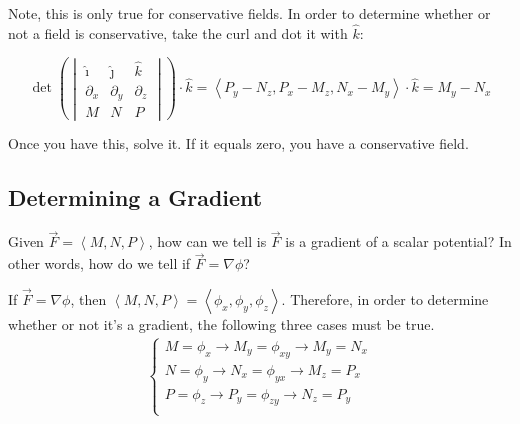 \documentclass{article}
\newcommand{\nvec}[1]{\left\langle #1 \right\rangle}
\begin{document}
    Note, this is only true for conservative fields. In order to determine whether or not a field is conservative, take the curl and dot it with $\hat{k}$:

    \begin{equation}
    \det \left(
    \begin{vmatrix}
    \hat{\imath} & \hat{\jmath} & \hat{k}\\
    \partial_x & \partial_y & \partial_z\\
    M & N & P
    \end{vmatrix}\right)
    \cdot \hat{k}
    =
    \nvec{P_y - N_z, P_x - M_z, N_x - M_y} \cdot \hat{k}
    =
    M_y - N_x
    \end{equation}

    Once you have this, solve it. If it equals zero, you have a conservative field.

    \subsection{Determining a Gradient}
    Given $\vec{F} = \nvec{M, N, P}$, how can we tell is $\vec{F}$ is a gradient of a scalar potential? In other words, how do we tell if $\vec{F}=\nabla\phi$?

    If $\vec{F}=\nabla\phi$, then $\nvec{M, N, P} = \nvec{\phi_x, \phi_y, \phi_z}$.
    Therefore, in order to determine whether or not it's a gradient, the following three cases must be true.
    \[
    \begin{aligned}
    \begin{cases}
        M = \phi_x \to M_y = \phi_{xy} \to M_y = N_x\\
        N = \phi_y \to N_x = \phi_{yx} \to M_z = P_x\\
        P = \phi_z \to P_y = \phi_{zy} \to N_z = P_y\\
    \end{cases}
    \end{aligned}
    \]
\end{document}

